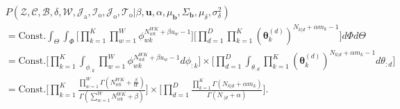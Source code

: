 \documentclass[a4paper]{article}
\begin{document}
  	     \begin{equation*}
  	     \begin{aligned}
  	     &P(\mathcal{Z}, \mathcal{C}, \mathcal{B},\delta, \mathcal{W},\mathcal{J}_{\mbox{a}}, \mathcal{I}_{\mbox{o}}, \mathcal{J}_{\mbox{o}}, \mathcal{T}_{\mbox{o}}| \beta, \boldsymbol{u}, \alpha, \mu_{\boldsymbol{b}}, \Sigma_{\boldsymbol{b}}, \mu_\delta, \sigma^2_\delta)\\&=\mbox{Const.}\int_{\Theta}\int_{\Phi}\Big[\prod_{k=1}^{K}\prod_{w=1}^{W}\phi_{wk}^{N^{WK}_{wk}+\beta u_w-1}\Big]\Big[\prod_{d=1}^{D}\prod_{k=1}^{K}(\boldsymbol{\theta}^{(d)}_{k})^{N_{k|d}+\alpha m_k-1}\Big]d\Phi d\Theta
  	     \\&=\mbox{Const.}\Big[\prod_{k=1}^{K}\int_{\phi_{:k}}\prod_{w=1}^{W}\phi_{wk}^{N^{WK}_{wk}+\beta u_w-1  }d\phi_{:k}\Big]\times\Big[\prod_{d=1}^{D}\int_{\theta_{:d}}\prod_{k=1}^{K}(\boldsymbol{\theta}^{(d)}_{k})^{N_{k|d}+\alpha m_k-1}d\theta_{:d}\Big]
  	     \\&=\mbox{Const.}\Big[\prod_{k=1}^{K}\frac{\prod_{w=1}^W\Gamma(N_{wk}^{WK}+\frac{\beta}{W})}{\Gamma(\sum_{w=1}^WN_{wk}^{WK}+\beta )}\Big]\times\Big[\prod_{d=1}^{D}\frac{\prod_{k=1}^K\Gamma(N_{k|d}+\alpha m_k)}{\Gamma(N_{\cdot|d}+\alpha)}\Big].
  	     \end{aligned}
  	     \end{equation*}
  	     \fi
\end{document}
